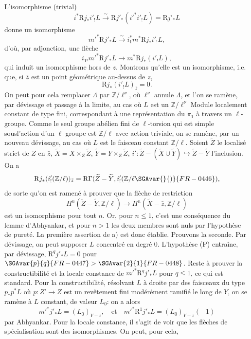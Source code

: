 L'isomorphisme (trivial)
\[
i^*\mathrm{R} j_*i'_!L\xrightarrow{\sim}\mathrm{R} j'_*(i'^*i'_!L)=\mathrm{R} j'_*L
\]
donne un
isomorphisme
\[
m'^*\mathrm{R} j'_*L\xrightarrow{\sim} i_1^*m^*\mathrm{R} j_*i'_!L,
\]
d'où, par adjonction, une flèche
\[
i_{1!}m'^*\mathrm{R} j'_*L\longrightarrow m^*\mathrm{R} j_*(i'_!L),
\]
qui induit un isomorphisme hors de $z$. Montrons qu'elle est un isomorphisme, i.e. que, si $\bar z$ est un point géométrique au-dessus de $z$,
\[
\mathrm{R} j_*(i'_!L)_{\bar z}=0.
\]
On peut pour cela remplacer $\Lambda$ par $\mathbb{Z}/\ell^\nu$, où $\ell^\nu$ annule $\Lambda$, et l'on se ramène, par dévissage et passage à la limite, au cas où $L$ est un $\mathbb{Z}/\ell^\nu$ Module localement constant de type fini, correspondant à une représentation du $\pi_1$ à travers un $\ell$-groupe. Comme le seul groupe abélien fini de $\ell$-torsion qui est simple sousl'action d'un $\ell$-groupe est $\mathbb{Z}/\ell$ avec action triviale, on se ramène, par un nouveau dévissage, au cas où $L$ est le faisceau constant $\mathbb{Z}/\ell$. Soient $\widetilde Z$ le localisé strict de $Z$ en $\bar z$, $\widetilde X=X\times_Z\widetilde Z$, $\widetilde Y=Y\times_Z\widetilde Z$, $i':\widetilde Z-(\widetilde X\cup\widetilde Y)\hookrightarrow \widetilde Z-\widetilde Y$ l'inclusion. On a
\[
\mathrm{R} j_*(i'_!(\mathbb{Z}/\ell))_{\bar z}
=\mathrm{R}\Gamma(\widetilde Z-\widetilde Y,i'_!(\mathbb{Z}/\ell\SGAvar{}{)}{FR-0446}),
\]
de sorte qu'on est ramené à prouver que la flèche de restriction
\[
H^n(\widetilde Z-\widetilde Y,\mathbb{Z}/\ell)
\longrightarrow
H^n(\widetilde X-\bar z,\mathbb{Z}/\ell)
\]
est un isomorphisme pour tout $n$. Or, pour $n\le1$, c'est une conséquence du lemme d'Abhyankar, et pour $n>1$ les deux membres sont nuls par l'hypothèse de pureté. La première assertion de a) est donc établie. Prouvons la seconde. Par dévissage, on peut supposer $L$ concentré en degré $0$. L'hypothèse (P) entraîne, par dévissage, $\mathrm{R}^qj'_*L=0$ pour $\SGAvar{p}{q}{FR-0447}>\SGAvar{2}{1}{FR-0448}$. Reste à prouver la constructibilité et la locale constance de $m'^*\mathrm{R}^qj'_*L$ pour $q\le1$, ce qui est standard. Pour la constructibilité, résolvant $L$ à droite par des faisceaux du type $p_*p^*L$ où $p:Z'\to Z$ est un revêtement fini modérément ramifié le long de $Y$, on se ramène à $L$ constant, de valeur $L_0$: on a alors
\[
m'^*j'_*L=(L_0)_{Y-z},
\quad\text{et}\quad
m'^*\mathrm{R}^1j'_*L=(L_0)_{Y-z}(-1)
\]
par Abhyankar. Pour la locale constance, il s'agit de voir que les flèches de spécialisation sont des isomorphismes. On peut, pour cela,
